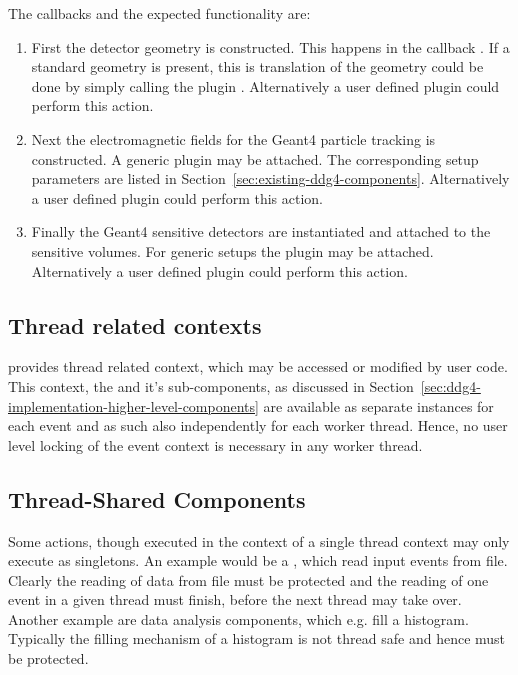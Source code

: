 The callbacks and the expected functionality are:
\begin{enumerate}
\item First the detector geometry is constructed. This happens in the callback
    {}. If a standard \DDhep geometry 
    is present, this is translation of the geometry could be done by simply 
    calling the plugin {}. 
    Alternatively a user defined plugin could perform this action.
\item Next the electromagnetic fields for the Geant4 particle tracking is
    constructed. A generic plugin {}
    may be attached. The corresponding setup parameters are listed in
    Section~\ref{sec:existing-ddg4-components}. 
    Alternatively a user defined plugin could perform this action.
\item Finally the Geant4 sensitive detectors are instantiated and attached 
    to the sensitive volumes. For generic setups the plugin
    {} may be attached.
    Alternatively a user defined plugin could perform this action.
\end{enumerate}

\subsection{Thread related contexts}
\label{sec:ddg4-thread-save context}
\noindent
\DDG provides thread related context, which may be accessed or modified
by user code. This context, the {} and it's sub-components,
as discussed in Section~\ref{sec:ddg4-implementation-higher-level-components}
are available as separate instances for each event and as such
also independently for each worker thread. Hence, no user level locking of the 
event context is necessary in any worker thread.

\subsection{Thread-Shared Components}
\label{sec:ddg4-multi-threaded-shared-actions}
\noindent
Some actions, though executed in the context of a single thread context 
may only execute as singletons. An example would be a {},
which read input events from file. Clearly the reading of data from
file must be protected and the reading of one event in a given thread
must finish, before the next thread may take over.
Another example are data analysis components, which e.g. fill a histogram.
Typically the filling mechanism of a histogram is not thread safe and hence must
be protected.

